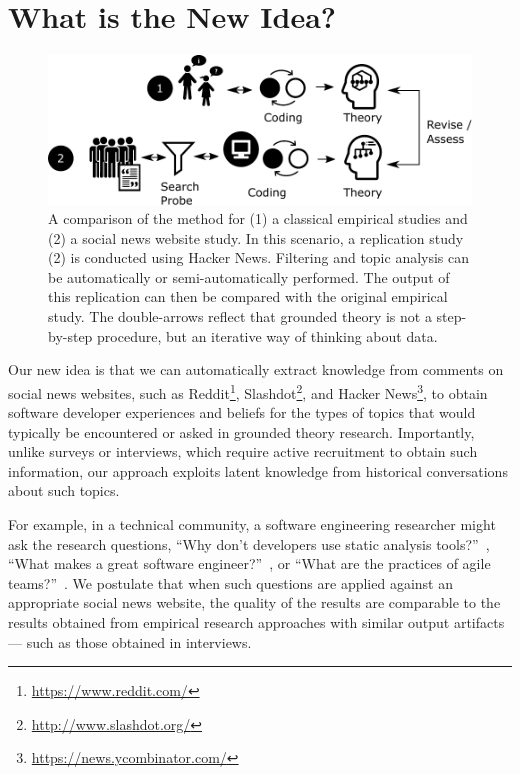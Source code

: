 \documentclass{sig-alternate}
\begin{document}
\section{What is the New Idea?}

\begin{figure}
\centering
\includegraphics[width=\linewidth]{concept}
\caption{A comparison of the method for (1) a classical empirical studies and (2) a social news website study. In this scenario, a replication study (2) is conducted using Hacker News. Filtering and topic analysis can be automatically or semi-automatically performed. The output of this replication can then be compared with the original empirical study. The double-arrows reflect that grounded theory is not a step-by-step procedure, but an iterative way of thinking about data.\label{fig:concept}}
\end{figure}

Our new idea is that we can automatically extract knowledge from comments on social news websites, such as Reddit\footnote{\url{https://www.reddit.com/}}, Slashdot\footnote{\url{http://www.slashdot.org/}}, and Hacker News\footnote{\url{https://news.ycombinator.com/}}, to obtain software developer experiences and beliefs for the types of topics that would typically be encountered or asked in grounded theory research. Importantly, unlike surveys or interviews, which require active recruitment to obtain such information, our approach exploits latent knowledge from historical conversations about such topics.

For example, in a technical community, a software engineering researcher might ask the research questions, ``Why don't developers use static analysis tools?''~\cite{Johnson2013a}, ``What makes a great software engineer?''~\cite{Li2015}, or ``What are the practices of agile teams?''~\cite{Hoda2011}. We postulate that when such questions are applied against an appropriate social news website, the quality of the results are comparable to the results obtained from empirical research approaches with similar output artifacts --- such as those obtained in interviews.
\end{document}
